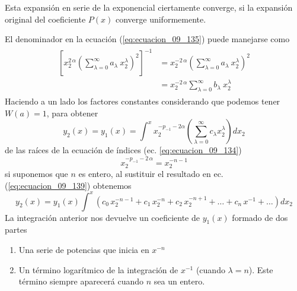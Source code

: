 Esta expansión en serie de la exponencial ciertamente converge, si la expansión original del coeficiente $P(x)$ converge uniformemente.
\par
El denominador en la ecuación (\ref{eq:ecuacion_09_135}) puede manejarse como
\begin{align}
\begin{aligned}
\left[ x_{2}^{2 \, \alpha} \left( \sum_{\lambda=0}^{\infty} a_{\lambda} \: x_{2}^{\lambda} \right)^{2} \right]^{-1} &= x_{2}^{-2 \, \alpha} \left( \sum_{\lambda=0}^{\infty} a_{\lambda} \: x_{2}^{\lambda} \right)^{2}  \\
&= x_{2}^{-2 \, \alpha} \sum_{\lambda=0}^{\infty} b_{\lambda} \: x_{2}^{\lambda}
\end{aligned}
\label{eq:ecuacion_09_138}
\end{align}
Haciendo a un lado los factores constantes considerando que podemos tener $W(a) = 1$, para obtener
\begin{equation}
y_{2}(x) =  y_{1}(x) = \int^{x} x_{2}^{-p_{-1}-2 \alpha} \left( \sum_{\lambda=0}^{\infty} c_{\lambda} x_{2}^{\lambda} \right) dx_{2} 
\label{eq:ecuacion_09_139}
\end{equation}
de las raíces de la ecuación de índices (ec. \ref{eq:ecuacion_09_134})
\begin{equation}
x_{2}^{-p_{-1} - 2 \, \alpha} = x_{2}^{-n-1}
\end{equation}
si suponemos que $n$ es entero, al sustituir el resultado en ec. (\ref{eq:ecuacion_09_139}) obtenemos 
\begin{equation}
y_{2}(x) = y_{1}(x) \int^{x} (c_{0} \, x_{2}^{-n-1} + c_{1} \, x_{2}^{-n} + c_{2} \, x_{2}^{-n+1} + \ldots + c_{n} \, x^{-1} + \ldots ) dx_{2}
\label{eq:ecuacion_09_141}
\end{equation}
La integración anterior nos devuelve un coeficiente de $y_{1}(x)$ formado de dos partes
\begin{enumerate}
\item Una serie de potencias que inicia en $x^{-n}$
\item Un término logarítmico de la integración de $x^{-1}$ (cuando $\lambda=n$). Este término siempre aparecerá cuando $n$ sea un entero.
\end{enumerate}
